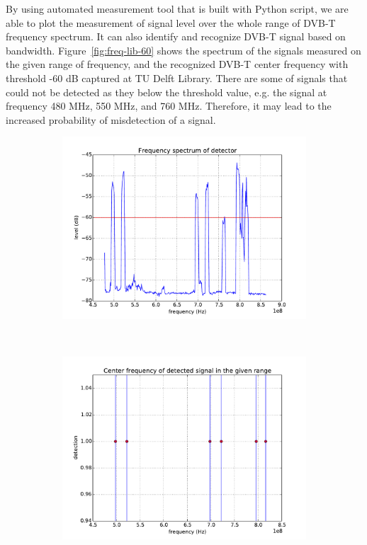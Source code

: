 By using automated measurement tool that is built with Python script, we are able to plot the measurement of signal level over the whole range of DVB-T frequency spectrum. It can also identify and recognize DVB-T signal based on bandwidth. Figure~\ref{fig:freq-lib-60} shows the spectrum of the signals measured on the given range of frequency, and the recognized DVB-T center frequency with threshold -60 dB captured at TU Delft Library. There are some of signals that could not be detected as they below the threshold value, e.g. the signal at frequency 480 MHz, 550 MHz, and 760 MHz. Therefore, it may lead to the increased probability of misdetection of a signal.

\begin{figure}[H]
    \centering
    \begin{subfigure}[b]{0.45\textwidth}
        \includegraphics[width=\textwidth]{figures/lib-60-freq}
    \end{subfigure}
    ~ %
    \begin{subfigure}[b]{0.45\textwidth}
        \includegraphics[width=\textwidth]{figures/lib-60-center}

\end{subfigure}
\end{figure}

